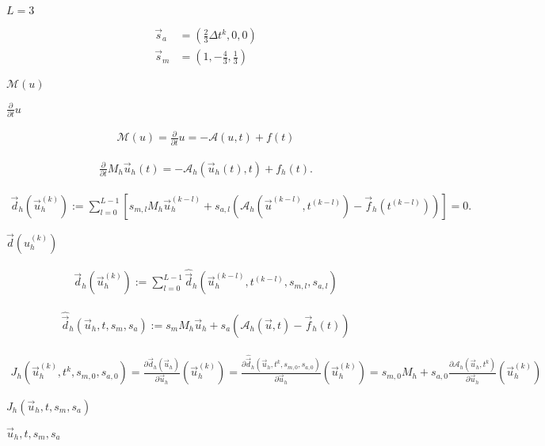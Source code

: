 \documentclass{article}
\begin{document}
$L = 3$
\pagebreak

\begin{align*} \vec{s}_a &= (\frac{2}{3} \Delta t^k, 0, 0)\\ \vec{s}_m &= (1, -\frac{4}{3}, \frac{1}{3}) \end{align*}
\pagebreak

$\mathcal{M}(u)$
\pagebreak

$\frac{\partial}{\partial t} u$
\pagebreak

\begin{align*} \mathcal{M}(u) = \frac{\partial}{\partial t} u = - \mathcal{A}(u, t) + f(t) \end{align*}
\pagebreak

\begin{align*} \frac{\partial}{\partial t} M_h \vec{u}_h(t) = - \mathcal{A}_h(\vec{u}_h(t), t) + f_h(t). \end{align*}
\pagebreak

\begin{align*} \vec{d}_h(\vec{u}_h^{(k)}) := \sum_{l=0}^{L-1} \left[ s_{m,l} M_h \vec{u}_h^{(k-l)} + s_{a,l} \left( \mathcal{A}_h(\vec{u}^{(k-l)}, t^{(k-l)}) - \vec{f}_h(t^{(k-l)}) \right) \right] = 0. \end{align*}
\pagebreak

$\vec{d}(u_h^{(k)})$
\pagebreak

\begin{align*} \vec{d}_h(\vec{u}_h^{(k)}) := \sum_{l=0}^{L-1} \hat{\vec{d}}_h(\vec{u}_h^{(k-l)}, t^{(k-l)}, s_{m,l}, s_{a,l}) \end{align*}
\pagebreak

\begin{align*} \hat{\vec{d}}_h(\vec{u}_h, t, s_m, s_a) := s_m M_h \vec{u}_h + s_a \left( \mathcal{A}_h(\vec{u}, t) - \vec{f}_h(t) \right) \end{align*}
\pagebreak

\begin{align*} J_h(\vec{u}_h^{(k)}, t^k, s_{m,0}, s_{a,0}) = \frac{\partial \vec{d}_h(\vec{u}_h)}{\partial \vec{u}_h} \left( \vec{u}_h^{(k)} \right) = \frac{\partial \hat{\vec{d}}_h(\vec{u}_h, t^k, s_{m,0}, s_{a,0})} {\partial \vec{u}_h} \left( \vec{u}_h^{(k)} \right) = s_{m,0} M_h + s_{a,0} \frac{\partial \mathcal{A}_h(\vec{u}_h, t^k)}{\partial \vec{u}_h} \left( \vec{u}_h^{(k)} \right) \end{align*}
\pagebreak

$J_h(\vec{u}_h, t, s_m, s_a)$
\pagebreak

$\vec{u}_h, t, s_m, s_a$
\pagebreak
\end{document}

